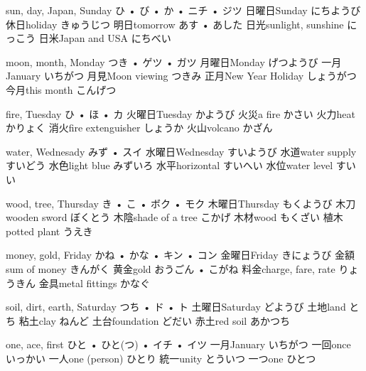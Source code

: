 



\setcounter{cardnum}{1}

		{sun, day, Japan, Sunday}
		{ひ • び • か • ニチ • ジツ}
		{日曜日}{Sunday にちようび}
		{休日}{holiday きゅうじつ}
		{明日}{tomorrow あす • あした}
		{日光}{sunlight, sunshine にっこう}
		{日米}{Japan and USA にちべい}

		{moon, month, Monday}
		{つき • ゲツ • ガツ}
		{月曜日}{Monday げつようび}
		{一月}{January いちがつ}
		{月見}{Moon viewing つきみ}
		{正月}{New Year Holiday しょうがつ}
		{今月}{this month こんげつ}

		{fire, Tuesday}
		{ひ • ほ • カ}
		{火曜日}{Tuesday かようび}
		{火災}{a fire かさい}
		{火力}{heat かりょく}
		{消火}{fire extenguisher しょうか}
		{火山}{volcano かざん}

		{water, Wednesady}
		{みず • スイ}
		{水曜日}{Wednesday すいようび}
		{水道}{water supply すいどう}
		{水色}{light blue みずいろ}
		{水平}{horizontal すいへい}
		{水位}{water level すいい}

		{wood, tree, Thursday}
		{き • こ • ボク • モク}
		{木曜日}{Thursday もくようび}
		{木刀}{wooden sword ぼくとう}
		{木陰}{shade of a tree こかげ}
		{木材}{wood もくざい}
		{植木}{potted plant うえき}

		{money, gold, Friday}
		{かね • かな • キン • コン}
		{金曜日}{Friday きにょうび}
		{金額}{sum of money きんがく}
		{黄金}{gold おうごん • こがね}
		{料金}{charge, fare, rate りょうきん}
		{金具}{metal fittings かなぐ}

		{soil, dirt, earth, Saturday}
		{つち • ド • ト}
		{土曜日}{Saturday どようび}
		{土地}{land とち}
		{粘土}{clay ねんど}
		{土台}{foundation どだい}
		{赤土}{red soil あかつち}

		{one, ace, first}
		{ひと • ひと(つ) • イチ • イツ}
		{一月}{January いちがつ}
		{一回}{once いっかい}
		{一人}{one (person) ひとり}
		{統一}{unity とういつ}
		{一つ}{one ひとつ}

